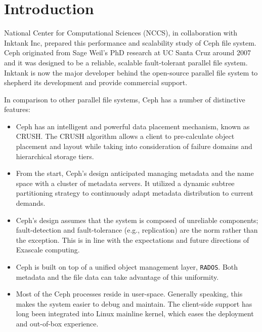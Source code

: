 \documentclass{article}
\begin{document}


\pagebreak
\thispagestyle{empty}
\tableofcontents

\pagebreak
\thispagestyle{empty}
\listoffigures

\clearpage
{}


\section{Introduction}

National Center for Computational Sciences (NCCS), in collaboration with
Inktank Inc, prepared this performance and scalability study of
Ceph file system. Ceph originated from Sage Weil's PhD research
at UC Santa Cruz around 2007 and it was designed to be a reliable, scalable
fault-tolerant parallel file system. Inktank is now the major developer behind
the open-source parallel file system to shepherd its development and provide
commercial support.

In comparison to other parallel file systems, Ceph has a number of distinctive
features:

\begin{itemize}
 
\item Ceph has an intelligent and powerful data placement mechanism, known as
  CRUSH. The CRUSH algorithm allows a client to pre-calculate object
  placement and layout while taking into consideration of failure domains and
  hierarchical storage tiers.
  
\item From the start, Ceph's design anticipated managing metadata and the name space
  with a cluster of metadata servers. It utilized a dynamic subtree partitioning
  strategy to continuously adapt metadata distribution to current demands.

\item Ceph's design assumes that the system is composed of unreliable
components; fault-detection and fault-tolerance (e.g., replication) are the
norm rather than the exception. This is in line with the expectations and
future directions of Exascale computing.

\item Ceph is built on top of a unified object management layer,
\texttt{RADOS}. Both metadata and the file data can take advantage of this
uniformity.

\item Most of the Ceph processes reside in user-space. Generally speaking, this makes the
system easier to debug and maintain. The client-side support has long been
integrated into Linux mainline kernel, which eases the deployment and out-of-box
experience.

\end{itemize}
\end{document}
